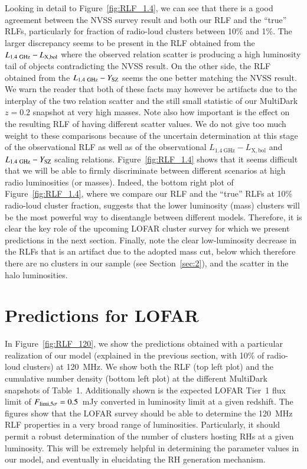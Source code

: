 \documentclass[traditabstract]{aa}
\newcommand{\rmn}{\mathrm}
\begin{document}
Looking in detail to Figure~\ref{fig:RLF_1.4}, we can see that there is a good agreement between the NVSS survey result and both our RLF and the ``true'' RLFs, particularly for fraction of radio-loud clusters between 10\% and 1\%. The larger discrepancy seems to be present in the RLF obtained from the $L_{1.4~\rmn{GHz}}-L_{\rm{X,bol}}$ where the  observed relation scatter is producing a high luminosity tail of objects contradicting the NVSS result. On the other side, the RLF obtained from the $L_{1.4~\rmn{GHz}}-Y_{\rm{SZ}}$ seems the one better matching the NVSS result. We warn the reader that both of these facts may however be artifacts due to the interplay of the two relation scatter and the still small statistic of our MultiDark $z = 0.2$ snapshot at very high masses. Note also how important is the effect on the resulting RLF of having different scatter values. We do not give too much weight to these comparisons because of the uncertain determination at this stage of the observational RLF as well as of the observational $L_{1.4~\rmn{GHz}}-L_{\rmn{X,bol}}$ and $L_{1.4~\rmn{GHz}}-Y_{\rm{SZ}}$ scaling relations. Figure~\ref{fig:RLF_1.4} shows that it seems difficult that we will be able to firmly discriminate between different scenarios at high radio luminosities (or masses). Indeed, the bottom right plot of Figure~\ref{fig:RLF_1.4}, where we compare our RLF and the ``true'' RLFs at 10\% radio-loud cluster fraction, suggests that the lower luminosity (mass) clusters will be the most powerful way to disentangle between different models. Therefore, it is clear the key role of the upcoming LOFAR cluster survey for which we present predictions in the next section. Finally, note the clear low-luminosity decrease in the RLFs that is an artifact due to the adopted mass cut, below which therefore there are no clusters in our sample (see Section~\ref{sec:2}), and the scatter in the halo luminosities. 

\section{Predictions for LOFAR}
\label{sec:5}

In Figure~\ref{fig:RLF_120}, we show the predictions obtained with a particular realization of our model (explained in the previous section, with 10\% of radio-loud clusters) at 120~MHz. We show both the RLF (top left plot) and the cumulative number density (bottom left plot) at the different MultiDark snapshots of Table~1. Additionally shown is the expected LOFAR Tier~1 flux limit of $F_{\rm{limi},5\sigma}=0.5$~mJy \citep{2012JApA..tmp...34R} converted in luminosity limit at a given redshift. The figures show that the LOFAR survey should be able to determine the 120~MHz RLF properties in a very broad range of luminosities. Particularly, it should permit a robust determination of the number of clusters hosting RHs at a given luminosity. This will be extremely helpful in determining the parameter values in our model, and eventually in elucidating the RH generation mechanism.
\end{document}
